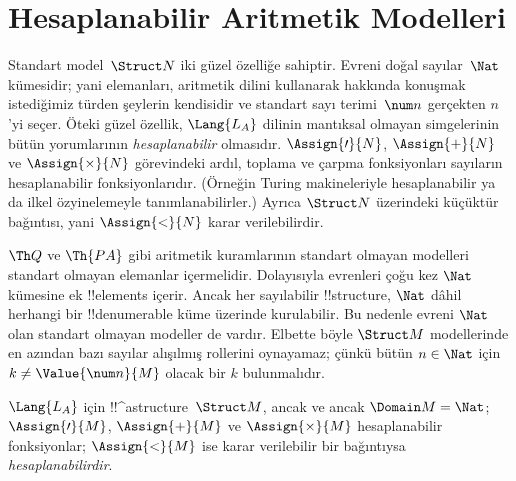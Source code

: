 \documentclass[../../../include/open-logic-section]{subfiles}
\begin{document}
\section{Hesaplanabilir Aritmetik Modelleri}

\begin{explain}
Standart model~$\Struct N$ iki güzel özelliğe sahiptir. Evreni doğal
sayılar~$\Nat$ kümesidir; yani elemanları, aritmetik dilini kullanarak
hakkında konuşmak istediğimiz türden şeylerin kendisidir ve standart
sayı terimi~$\num n$ gerçekten $n$'yi seçer. Öteki güzel özellik,
$\Lang{L_A}$ dilinin mantıksal olmayan simgelerinin bütün yorumlarının
\emph{hesaplanabilir} olmasıdır. $\Assign{\prime}{N}$,
$\Assign{+}{N}$ ve $\Assign{\times}{N}$ görevindeki ardıl, toplama ve
çarpma fonksiyonları sayıların hesaplanabilir fonksiyonlarıdır. (Örneğin
Turing makineleriyle hesaplanabilir ya da ilkel özyinelemeyle
tanımlanabilirler.) Ayrıca $\Struct N$ üzerindeki küçüktür bağıntısı,
yani $\Assign{<}{N}$ karar verilebilirdir.

$\Th Q$ ve $\Th{PA}$ gibi aritmetik kuramlarının standart olmayan
modelleri standart olmayan elemanlar içermelidir. Dolayısıyla evrenleri
çoğu kez $\Nat$ kümesine ek !!{element}s içerir. Ancak her sayılabilir
!!{structure}, $\Nat$ dâhil herhangi bir !!{denumerable} küme üzerinde
kurulabilir. Bu nedenle evreni $\Nat$ olan standart olmayan modeller de
vardır. Elbette böyle $\Struct M$ modellerinde en azından bazı sayılar
alışılmış rollerini oynayamaz; çünkü bütün $n\in\Nat$ için
$k\neq\Value{\num n}{M}$ olacak bir $k$ bulunmalıdır.
\end{explain}

\begin{defn}
$\Lang{L_A}$ için !!^a{structure}~$\Struct M$, ancak ve ancak
$\Domain M=\Nat$; $\Assign{\prime}{M}$, $\Assign{+}{M}$ ve
$\Assign{\times}{M}$ hesaplanabilir fonksiyonlar; $\Assign{<}{M}$ ise
karar verilebilir bir bağıntıysa \emph{hesaplanabilirdir}.
\end{defn}
\end{document}
